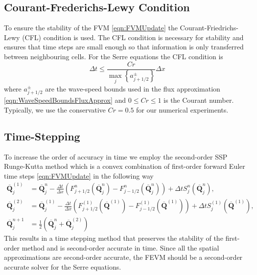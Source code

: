 \documentclass[times]{elsarticle}
\newcommand{\vecn}[1]{\boldsymbol{#1}}
\begin{document}
\subsection{Courant-Frederichs-Lewy Condition}
To ensure the stability of the FVM \eqref{eqn:FVMUpdate} the Courant-Friedrichs-Lewy (CFL) condition \cite{Courant-etal-1967-215} is used. The CFL condition is necessary for stability and ensures that time steps are small enough so that information is only transferred between neighbouring cells. For the Serre equations the CFL condition is
\begin{equation}
\Delta t \le \frac{Cr }{\max_{j} \left\lbrace a^\pm_{j+1/2} \right\rbrace} \Delta x
\label{eqn:CFLcond}
\end{equation}
where $a^\pm_{j+1/2} $ are the wave-speed bounds used in the flux approximation \eqref{eqn:WaveSpeedBoundsFluxApprox} and $0\le Cr \le 1$ is the Courant number. Typically, we use the conservative $Cr = 0.5$ for our numerical experiments.

\subsection{Time-Stepping}
To increase the order of accuracy in time we employ the second-order SSP Runge-Kutta method \cite{Gottlieb-etal-2003-89} which is a convex combination of first-order forward Euler time steps \eqref{eqn:FVMUpdate} in the following way
\begin{subequations}
	\begin{align}
\overline{\vecn{Q} }^{(1)}_j &= \overline{\vecn{Q} }^{n}_j - \frac{\Delta t}{\Delta x} \left(F^n_{j+1/2}\left(\overline{\vecn{Q} }^{n}_j \right) - F^n_{j-1/2}\left(\overline{\vecn{Q} }^{n}_j \right) \right) + \Delta t S^n_j\left(\overline{\vecn{Q} }^{n}_j\right),\\
\overline{\vecn{Q} }^{(2)}_j &= \overline{\vecn{Q} }^{(1)}_j - \frac{\Delta t}{\Delta x} \left(F^{(1)}_{j+1/2}\left(\overline{\vecn{Q} }^{(1)} \right) - F^{(1)}_{j-1/2}\left(\overline{\vecn{Q} }^{(1)} \right) \right) + \Delta t S^{(1)}_j\left(\overline{\vecn{Q} }^{(1)} \right),\\
	\overline{\vecn{Q} }^{n+1}_j &= \frac{1}{2} \left( \overline{\vecn{Q} }^n_j +  \overline{\vecn{Q} }_j^{(2)}  \right)
	\end{align}
	\label{eqn:SSPRKStep1}
\end{subequations}
This results in a time stepping method that preserves the stability of the first-order method and is second-order accurate in time. Since all the spatial approximations are second-order accurate, the FEVM should be a second-order accurate solver for the Serre equations.
\end{document}
